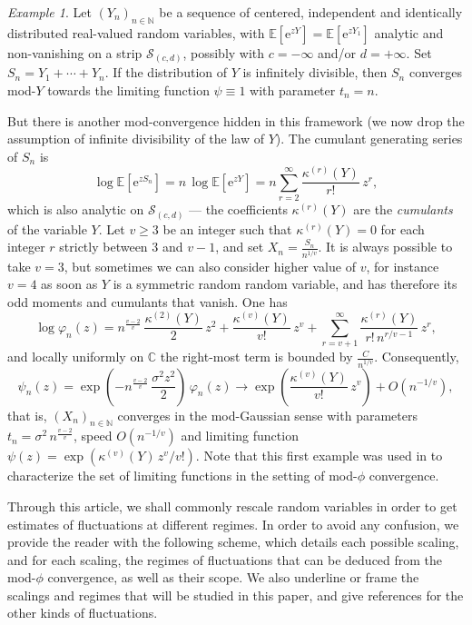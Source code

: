 \documentclass[12pt,a4paper,reqno]{amsart}
\theoremstyle{remark}
\newtheorem{example}[lemma]{Example}
\newcommand{\N}{\mathbb{N}}
\newcommand{\C}{\mathbb{C}}
\newcommand{\E}{\mathrm{e}}
\newcommand{\esper}{\mathbb{E}}
\begin{document}
\begin{example}\label{ex:sumiid}
Let $(Y_{n})_{n \in \N}$ be a sequence of centered, independent and identically distributed real-valued random variables, with $\esper[\E^{zY}]=\esper[\E^{zY_{1}}]$ analytic and non-vani\-shing on a strip $\mathcal{S}_{(c,d)}$, possibly with $c=-\infty$ and/or $d=+\infty$. Set $S_{n}=Y_{1}+\cdots+Y_{n}$. If the distribution of $Y$ is infinitely divisible,
then $S_n$ converges mod-$Y$ towards the limiting function $\psi \equiv 1$ with parameter $t_n=n$.\medskip

But there is another mod-convergence hidden in this framework (we now drop the assumption of infinite divisibility of the law of $Y$). The cumulant generating series of $S_{n}$ is
$$\log \esper[\E^{zS_{n}}]=n \,\log \esper[\E^{zY}] = n \sum_{r = 2}^{\infty}\frac{\kappa^{(r)}(Y)}{r!}\,z^{r},$$
which is also analytic on $\mathcal{S}_{(c,d)}$ --- the coefficients $\kappa^{(r)}(Y)$ are the \emph{cumulants} of the variable $Y$. Let $v\geq 3$ be an integer such that $\kappa^{(r)}(Y)=0$ for each integer $r$ strictly between $3$ and $v-1$, and set $X_{n}=\frac{S_{n}}{n^{1/v}}$. It is always possible to take $v=3$, but sometimes we can also consider higher value of $v$, for instance $v=4$ as soon as $Y$ is a symmetric random random variable, and has therefore its odd moments and cumulants that vanish. One has
$$\log \varphi_{n}(z) = n^{\frac{v-2}{v}} \,\frac{\kappa^{(2)}(Y)}{2}\,z^{2} + \frac{\kappa^{(v)}(Y)}{v!}\,z^{v} + \sum_{r = v+1}^{\infty} \frac{\kappa^{(r)}(Y)}{r!\,n^{r/v-1}}\,z^{r},$$
and locally uniformly on $\C$ the right-most term is bounded by $\frac{C}{n^{1/v}}$. Consequently, 
$$\psi_{n}(z)=\exp\left(-n^{\frac{v-2}{v}}\,\frac{\sigma^{2}z^{2}}{2}\right)\,\varphi_{n}(z) \to \exp\left(\frac{\kappa^{(v)}(Y)}{v!}\,z^{v}\right) + O(n^{-1/v}),$$
that is, $(X_{n})_{n \in \N}$ converges in the mod-Gaussian sense with parameters $t_{n}=\sigma^{2}\,n^{\frac{v-2}{v}}$, speed $O(n^{-1/v})$ and limiting function $\psi(z)=\exp(\kappa^{(v)}(Y)\,z^{v}/v!)$.  Note that this first example was used in \cite{KNN13} to characterize the set of limiting functions in the setting of mod-$\phi$ convergence.
\bigskip

Through this article, we shall commonly rescale random variables in order to get estimates of fluctuations at different regimes. In order to avoid any confusion, we provide the reader with the following scheme, which details each possible scaling, and for each scaling, the regimes of fluctuations that can be deduced from the mod-$\phi$ convergence, as well as their scope. We also underline or frame the scalings and regimes that will be studied in this paper, and give references for the other kinds of fluctuations.


\end{example}
\end{document}
